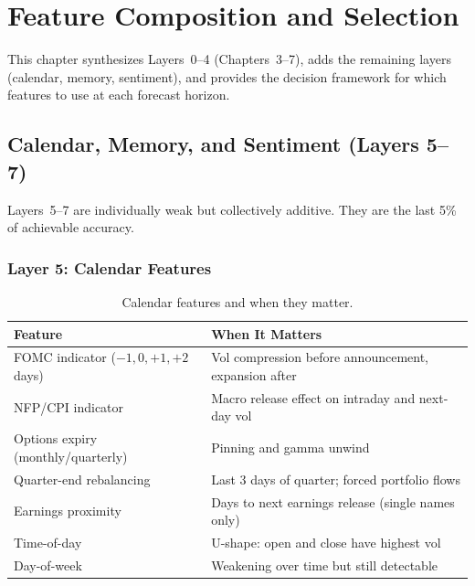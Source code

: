 \chapter{Feature Composition and Selection}
\label{ch:feature-composition}

This chapter synthesizes Layers~0--4 (Chapters~3--7), adds the remaining layers (calendar, memory, sentiment), and provides the decision framework for which features to use at each forecast horizon.

\section{Calendar, Memory, and Sentiment (Layers 5--7)}
\label{sec:layers-5-7}

Layers~5--7 are individually weak but collectively additive.
They are the last 5\% of achievable accuracy.

\subsection*{Layer 5: Calendar Features}

\begin{table}[htbp]
\centering
\caption{Calendar features and when they matter.}
\label{tab:calendar-features}
\small
\begin{tabular}{@{}p{4.8cm}p{8.5cm}@{}}
\toprule
\textbf{Feature} & \textbf{When It Matters} \\
\midrule
FOMC indicator ($-1, 0, +1, +2$ days) &
  Vol compression before announcement, expansion after \\[4pt]
NFP/CPI indicator &
  Macro release effect on intraday and next-day vol \\[4pt]
Options expiry (monthly/quarterly) &
  Pinning and gamma unwind \\[4pt]
Quarter-end rebalancing &
  Last 3 days of quarter; forced portfolio flows \\[4pt]
Earnings proximity &
  Days to next earnings release (single names only) \\[4pt]
Time-of-day &
  U-shape: open and close have highest vol \\[4pt]
Day-of-week &
  Weakening over time but still detectable \\
\bottomrule
\end{tabular}
\end{table}

